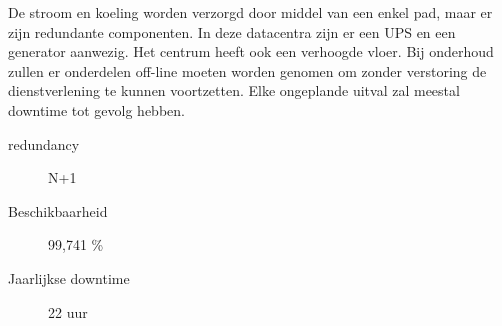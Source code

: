 De stroom en koeling worden verzorgd door middel van een enkel pad, maar er zijn redundante componenten. In deze datacentra zijn er een UPS en een generator aanwezig. Het centrum heeft ook een verhoogde vloer. Bij onderhoud zullen er onderdelen off-line moeten worden genomen om zonder verstoring de dienstverlening te kunnen voortzetten. Elke ongeplande uitval zal meestal downtime tot gevolg hebben.
\begin{description}
\item[redundancy] N+1
\item[Beschikbaarheid] 99,741 \%
\item[Jaarlijkse downtime] 22 uur
\end{description}

